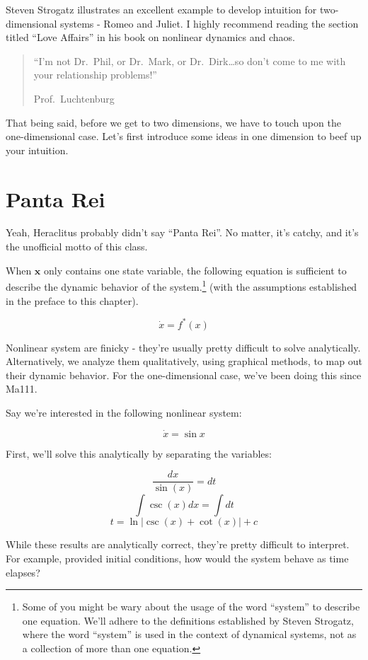 \documentclass[
  letterpaper,
  DIV=11,
  numbers=noendperiod]{scrreprt}
\begin{document}
Steven Strogatz illustrates an excellent example to develop intuition
for two-dimensional systems - Romeo and Juliet. I highly recommend
reading the section titled ``Love Affairs'' in his book on nonlinear
dynamics and chaos.

\begin{quote}
``I'm not Dr.~Phil, or Dr.~Mark, or Dr.~Dirk\ldots so don't come to me
with your relationship problems!''

Prof.~Luchtenburg
\end{quote}

That being said, before we get to two dimensions, we have to touch upon
the one-dimensional case. Let's first introduce some ideas in one
dimension to beef up your intuition.

\hypertarget{panta-rei}{%
\section{Panta Rei}\label{panta-rei}}

Yeah, Heraclitus probably didn't say ``Panta Rei''. No matter, it's
catchy, and it's the unofficial motto of this class.

When \(\boldsymbol{x}\) only contains one state variable, the following
equation is sufficient to describe the dynamic behavior of the
system.\footnote{Some of you might be wary about the usage of the word
  ``system'' to describe one equation. We'll adhere to the definitions
  established by Steven Strogatz, where the word ``system'' is used in
  the context of dynamical systems, not as a collection of more than one
  equation.} (with the assumptions established in the preface to this
chapter).

\[\dot{x} = f^* (x)\]

Nonlinear system are finicky - they're usually pretty difficult to solve
analytically. Alternatively, we analyze them qualitatively, using
graphical methods, to map out their dynamic behavior. For the
one-dimensional case, we've been doing this since Ma111.

Say we're interested in the following nonlinear system:

\[\dot{x} = \sin{x}\]

First, we'll solve this analytically by separating the variables:

\[\frac{dx}{\sin(x)} = dt\] \[\int{\csc(x) dx} = \int{dt}\]
\[t = \ln\left|\csc(x) + \cot(x) \right| + c \]

While these results are analytically correct, they're pretty difficult
to interpret. For example, provided initial conditions, how would the
system behave as time elapses?
\end{document}
